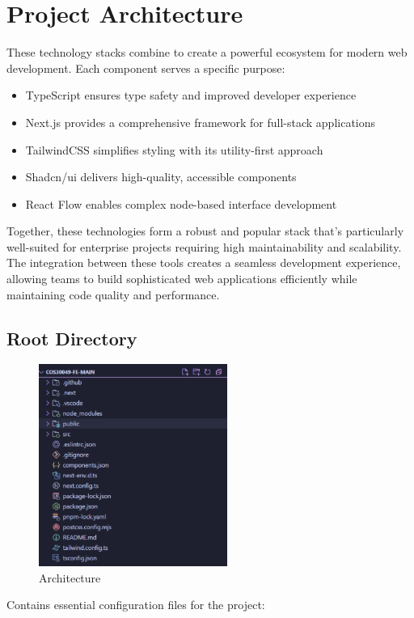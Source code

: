 \chapter{Project Architecture} 

These technology stacks combine to create a powerful ecosystem for modern web development. Each component serves a specific purpose:

\begin{itemize}
\item TypeScript ensures type safety and improved developer experience
\item Next.js provides a comprehensive framework for full-stack applications
\item TailwindCSS simplifies styling with its utility-first approach
\item Shadcn/ui delivers high-quality, accessible components
\item React Flow enables complex node-based interface development
\end{itemize}

Together, these technologies form a robust and popular stack that's particularly well-suited for enterprise projects requiring high maintainability and scalability. The integration between these tools creates a seamless development experience, allowing teams to build sophisticated web applications efficiently while maintaining code quality and performance.
\section{Root Directory}
\begin{figure}[H]
    \centering
    \includegraphics[width=0.55\textwidth]{figures/architecture.png}
    \caption{Architecture}
\end{figure}
Contains essential configuration files for the project:

